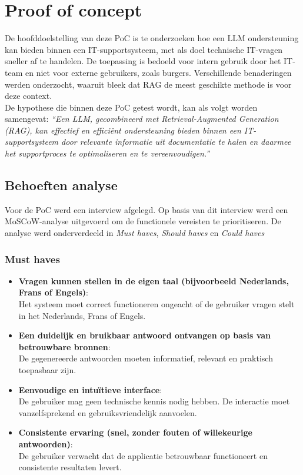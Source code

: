 \chapter{Proof of concept}
\label{ch:proof-of-concept}

De hoofddoelstelling van deze PoC is te onderzoeken hoe een LLM ondersteuning kan bieden binnen een IT-supportsysteem, met als doel technische IT-vragen sneller af te handelen. De toepassing is bedoeld voor intern gebruik door het IT-team en niet voor externe gebruikers, zoals burgers. Verschillende benaderingen werden onderzocht, waaruit bleek dat RAG de meest geschikte methode is voor deze context.
\\[1em]
De hypothese die binnen deze PoC getest wordt, kan als volgt worden samengevat:
\textit{“Een LLM, gecombineerd met Retrieval-Augmented Generation (RAG), kan effectief en efficiënt ondersteuning bieden binnen een IT-supportsysteem door relevante informatie uit documentatie te halen en daarmee het supportproces te optimaliseren en te vereenvoudigen.”}

\section{Behoeften analyse}
Voor de PoC werd een interview afgelegd. Op basis van dit interview werd een MoSCoW-analyse uitgevoerd om de functionele vereisten te prioritiseren. De analyse werd onderverdeeld in \textit{Must haves}, \textit{Should haves} en \textit{Could haves}

\subsection{Must haves}
\begin{itemize}
    \item \textbf{Vragen kunnen stellen in de eigen taal (bijvoorbeeld Nederlands, Frans of Engels)}:\\ 
    Het systeem moet correct functioneren ongeacht of de gebruiker vragen stelt in het Nederlands, Frans of Engels.
    \item \textbf{Een duidelijk en bruikbaar antwoord ontvangen op basis van betrouwbare bronnen}:\\ 
    De gegenereerde antwoorden moeten informatief, relevant en praktisch toepasbaar zijn.
    \item \textbf{Eenvoudige en intuïtieve interface}:\\  
    De gebruiker mag geen technische kennis nodig hebben. De interactie moet vanzelfsprekend en gebruiksvriendelijk aanvoelen.
    \item \textbf{Consistente ervaring (snel, zonder fouten of willekeurige antwoorden)}:\\  
    De gebruiker verwacht dat de applicatie betrouwbaar functioneert en consistente resultaten levert.
\end{itemize}


